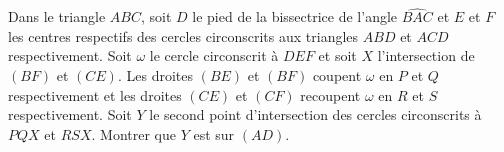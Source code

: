Dans le triangle $ABC$, soit $D$ le pied de la bissectrice de l'angle $\widehat{BAC}$ et $E$ et $F$ les centres respectifs des cercles circonscrits aux triangles $ABD$ et $ACD$ respectivement. Soit $\omega$ le cercle circonscrit à $DEF$ et soit $X$ l'intersection de $(BF)$ et $(CE)$. Les droites $(BE)$ et $(BF)$ coupent $\omega$ en $P$ et $Q$ respectivement et les droites $(CE)$ et $(CF)$ recoupent $\omega$ en $R$ et $S$ respectivement. Soit $Y$ le second point d'intersection des cercles circonscrits à $PQX$ et $RSX$. Montrer que $Y$ est sur $(AD)$.